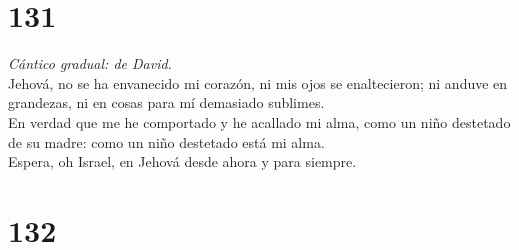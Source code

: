 \hypertarget{section-130}{%
\section{131}\label{section-130}}

 \emph{Cántico gradual: de David.}\\
Jehová, no se ha envanecido mi corazón, ni mis ojos se enaltecieron; ni
anduve en grandezas, ni en cosas para mí demasiado sublimes.\\
 En verdad que me he comportado y he acallado mi alma, como
un niño destetado de su madre: como un niño destetado está mi alma.\\
 Espera, oh Israel, en Jehová desde ahora y para siempre.

\hypertarget{section-131}{%
\section{132}\label{section-131}}

